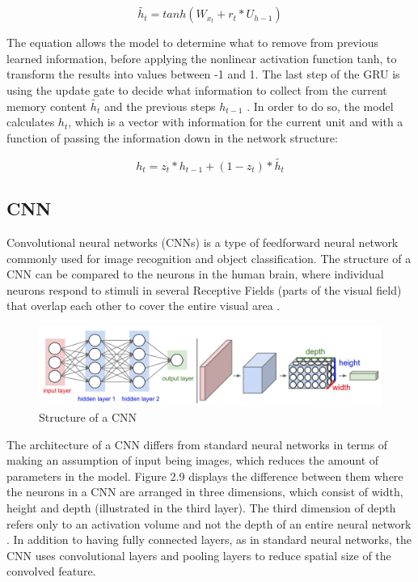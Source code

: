 \begin{equation}
\tilde{h_{t}} = tanh(W_{x_{t}} + r_{t} * U_{h-1})
\end{equation}

\indent\newline 
The equation allows the model to determine what to remove from previous learned information, before applying the nonlinear activation function tanh, to transform the results into values between -1 and 1. The last step of the GRU is using the update gate to decide what information to collect from the current memory content $\tilde{h_{t}}$ and the previous steps $h_{t-1}$ \cite{kosta}. In order to do so, the model calculates $h_{t}$, which is a vector with information for the current unit and with a function of passing the information down in the network structure:

\begin{equation}
h_{t} = z_{t} * h_{t-1} + (1 - z_{t}) * \tilde{h_{t}}
\end{equation}

\subsection{CNN}
Convolutional neural networks (CNNs) is a type of feedforward neural network commonly used for image recognition and object classification. The structure of a CNN can be compared to the neurons in the human brain, where individual neurons respond to stimuli in several Receptive Fields (parts of the visual field) that overlap each other to cover the entire visual area \cite{saha}.   

\indent\newline 
\begin{figure}[H]
\centering
\includegraphics [scale=0.34,angle=360]{figures/cnn.png}
\caption{Structure of a CNN \cite{zakka}}
\label{fig:cnn}
\end{figure}

\indent\newline 
The architecture of a CNN differs from standard neural networks in terms of making an assumption of input being images, which reduces the amount of parameters in the model. Figure 2.9 displays the difference between them where the neurons in a CNN are arranged in three dimensions, which consist of width, height and depth (illustrated in the third layer). The third dimension of depth refers only to an activation volume and not the depth of an entire neural network \cite{zakka}. In addition to having fully connected layers, as in standard neural networks, the CNN uses convolutional layers and pooling layers to reduce spatial size of the convolved feature. 

